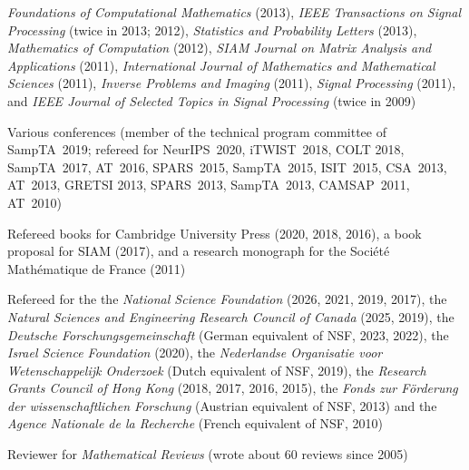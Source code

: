 \documentclass[11pt]{article}
\begin{document}
{\sl \mbox{Foundations} of Computational Mathematics} (2013),
{\sl IEEE Transactions on Signal Processing} (twice in 2013; 2012), 
{\sl Statistics and Probability Letters} (2013),
{\sl Mathematics of Computation} (2012),
{\sl SIAM Journal on Matrix Analysis and Applications} (2011),
{\sl International Journal of Mathematics and Mathematical Sciences} (2011),
{\sl Inverse Problems and Imaging} (2011),
{\sl Signal Processing} (2011),
and
{\sl IEEE Journal of Selected Topics in Signal Processing} (twice in 2009)
\item Various conferences 
(member of the technical program committee of SampTA~2019;
refereed for NeurIPS~2020,
 iTWIST~2018, COLT 2018, SampTA~2017, AT~2016, SPARS~2015, SampTA~2015, ISIT~2015, CSA~2013, AT~2013, GRETSI 2013, SPARS~2013, SampTA~2013, CAMSAP~2011, AT~2010)
\item Refereed 
books for Cambridge University Press (2020, 2018, 2016),
a book proposal for SIAM (2017),
and a research monograph for the Soci\'{e}t\'{e} Math\'{e}matique de France (2011)
\item Refereed for the 
the
{\sl National Science Foundation} (2026, 2021, 2019, 2017),
the
{\sl Natural Sciences and Engineering Research Council of Canada} (2025, 2019),
the
{\sl Deutsche Forschungsgemeinschaft} (German equivalent of NSF, 2023, 2022),
the
{\sl Israel Science Foundation} (2020),
the
{\sl Nederlandse Organisatie voor Wetenschappelijk Onderzoek} (Dutch equivalent of NSF, 2019),
the
{\sl Research Grants Council of Hong Kong} (2018, 2017, 2016, 2015),
the 
{\sl Fonds zur F\"orderung der wissenschaftlichen Forschung} (Austrian equivalent of NSF, 2013) 
and the
 {\sl Agence Nationale de la Recherche} (French equivalent of NSF, 2010)
\item Reviewer for {\sl Mathematical Reviews} (wrote about 60 reviews since 2005)
 \eitemize
 
 \vspace{0mm}
 
\end{document}
